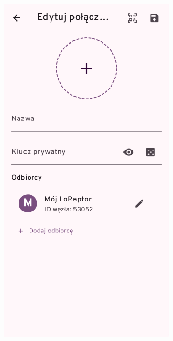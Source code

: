\clearpage
\begin{figure}[H]
	\centering
	\begin{minipage}[b]{0.45\textwidth}
		\centering
		\includegraphics[width=\textwidth]{root/raptchat_edit_connection.png}

\end{minipage}
\end{figure}
